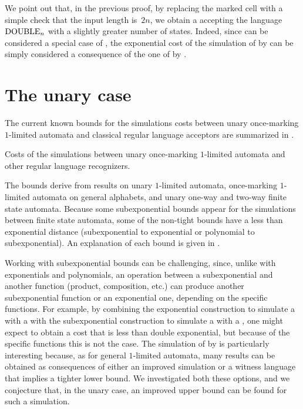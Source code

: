 	We point out that, in the previous proof, by replacing the marked cell with a simple check that the input length is~$2n$, we obtain a \TDFA accepting the language~$\mathrm{DOUBLE}_n$ with a slightly greater number of states.
	Indeed, since \TDFAs can be considered a special case of \OMODLAs, the exponential cost of the simulation of \OMODLAs by \ONFAs can be simply considered a consequence of the one of \TDFAs by \ONFAs.



\section{The unary case}\label{sec:oncemarking-unary}
The current known bounds for the simulations costs between unary once-marking $1$-limited automata and classical regular language acceptors are summarized in .

\begin{table}
	\caption{Costs of the simulations between unary once-marking $1$-limited automata and other regular language recognizers.}
	\label{tab:sims-om-unary-oncemarking}
\end{table}

The bounds derive from results on unary $1$-limited automata, once-marking $1$-limited automata on general alphabets, and unary one-way and two-way finite state automata.
Because some subexponential bounds appear for the simulations between finite state automata, some of the non-tight bounds have a less than exponential distance (subexponential to exponential or polynomial to subexponential).
An explanation of each bound is given in .

Working with subexponential bounds can be challenging, since, unlike with exponentials and polynomials, an operation between a subexponential and another function (product, composition, etc.) can produce another subexponential function or an exponential one, depending on the specific functions.
For example, by combining the exponential construction to simulate a \OLA with a \ONFA with the subexponential construction to simulate a \ONFA with a \ODFA, one might expect to obtain a cost that is less than double exponential, but because of the specific functions this is not the case.
The simulation of \OMOLAs by \ODFAs is particularly interesting because, as for general $1$-limited automata, many results can be obtained as consequences of either an improved simulation or a witness language that implies a tighter lower bound.
We investigated both these options, and we conjecture that, in the unary case, an improved upper bound can be found for such a simulation.




